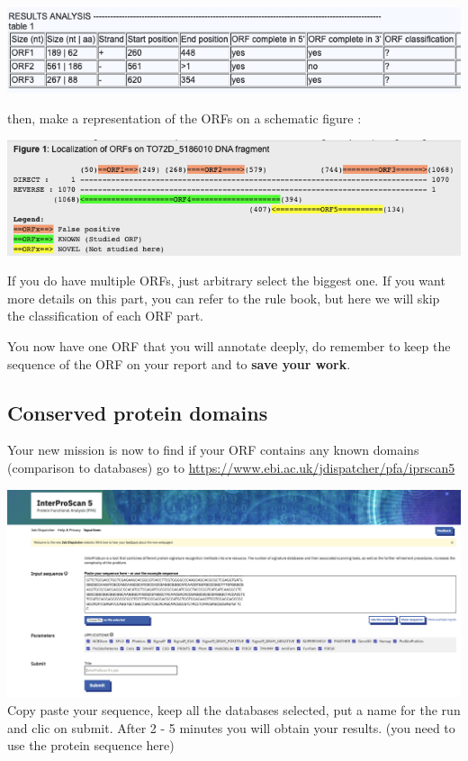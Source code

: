 \documentclass[
]{book}
\begin{document}
\includegraphics{figures/Annotathon/Annot_table1_ORF.png}

then, make a representation of the ORFs on a schematic figure :

\includegraphics{figures/Annotathon/Annot_figure1_ORF.png}

If you do have multiple ORFs, just arbitrary select the biggest one. If you want more details on this part, you can refer to the rule book, but here we will skip the classification of each ORF part.

You now have one ORF that you will annotate deeply, do remember to keep the sequence of the ORF on your report and to \textbf{save your work}.

\hypertarget{conserved-protein-domains}{%
\subsection{Conserved protein domains}\label{conserved-protein-domains}}

Your new mission is now to find if your ORF contains any known domains (comparison to databases)
go to \url{https://www.ebi.ac.uk/jdispatcher/pfa/iprscan5}

\includegraphics{figures/Annotathon/Annot_protein_domain.png}
Copy paste your sequence, keep all the databases selected, put a name for the run and clic on submit. After 2 - 5 minutes you will obtain your results. (you need to use the protein sequence here)
\end{document}
